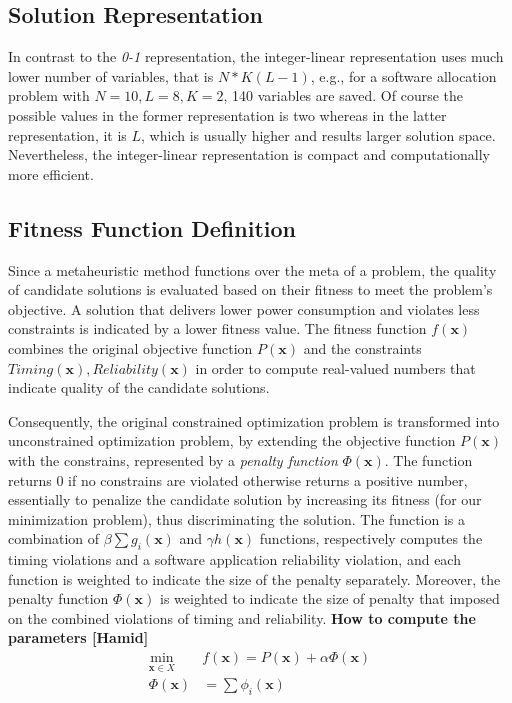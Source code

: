 \subsection{Solution Representation}
In contrast to the \textit{0-1} representation, the integer-linear representation uses much lower number of variables, that is $N*K(L-1)$, e.g., for a software allocation problem with $N=10,L=8,K=2$, 140 variables are saved. Of course the possible values in the former representation is two whereas in the latter representation, it is $L$, which is usually higher and results larger solution space. Nevertheless, the integer-linear representation is compact and computationally more efficient.

\subsection{Fitness Function Definition}
Since a metaheuristic method functions over the meta of a problem, the quality of candidate solutions is evaluated based on their fitness to meet the problem's objective. A solution that delivers lower power consumption and violates less constraints is indicated by a lower fitness value. The fitness function $f(\textbf{x})$ combines the original objective function $P(\textbf{x})$ and the constraints $Timing(\textbf{x}),Reliability(\textbf{x})$ in order to compute real-valued numbers that indicate quality of the candidate solutions.

Consequently, the original constrained optimization problem is transformed into unconstrained optimization problem, by extending the objective function $P(\textbf{x})$ with the constrains, represented by a \textit{penalty function} $\Phi(\textbf{x})$. The function returns 0 if no constrains are violated otherwise returns a positive number, essentially to penalize the candidate solution by increasing its fitness (for our minimization problem), thus discriminating the solution. The function is a combination of $\beta\sum{g_i(\textbf{x})}$ and $\gamma h(\textbf{x})$ functions, respectively computes the timing violations and a software application reliability violation, and each function is weighted to indicate the size of the penalty separately. Moreover, the penalty function $\Phi({\textbf{x}})$ is weighted to indicate the size of penalty that imposed on the combined violations of timing and reliability. \textbf{How to compute the parameters [Hamid]}
\begin{align}
\label{}
    \min_{\textbf{x}\in X}\;\;& f(\textbf{x})=P(\textbf{x}) + \alpha \Phi(\textbf{x})\\
    \label{eqn_penalityfunc}\Phi(\textbf{x}) &= \sum\phi_i(\textbf{x})
\end{align}

